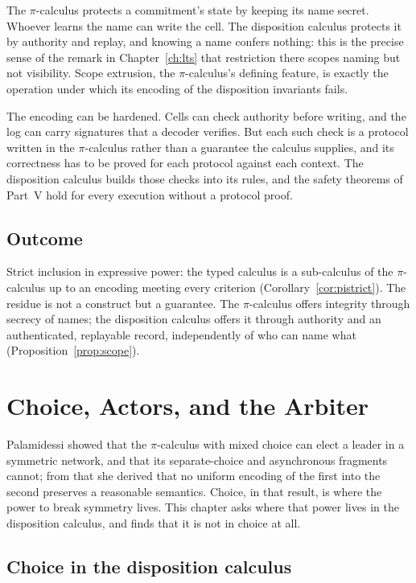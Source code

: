 \documentclass[11pt,openany]{book}
\theoremstyle{remark}
\begin{document}
The $\pi$-calculus protects a commitment's state by keeping its name
secret. Whoever learns the name can write the cell. The disposition
calculus protects it by authority and replay, and knowing a name confers
nothing: this is the precise sense of the remark in
Chapter~\ref{ch:lts} that restriction there scopes naming but not
visibility. Scope extrusion, the $\pi$-calculus's defining feature, is
exactly the operation under which its encoding of the disposition
invariants fails.

The encoding can be hardened. Cells can check authority before writing,
and the log can carry signatures that a decoder verifies. But each such
check is a protocol written in the $\pi$-calculus rather than a guarantee
the calculus supplies, and its correctness has to be proved for each
protocol against each context. The disposition calculus builds those
checks into its rules, and the safety theorems of Part~V hold for every
execution without a protocol proof.

\section{Outcome}

Strict inclusion in expressive power: the typed calculus is a
sub-calculus of the $\pi$-calculus up to an encoding meeting every
criterion (Corollary~\ref{cor:pistrict}). The residue is not a construct
but a guarantee. The $\pi$-calculus offers integrity through secrecy of
names; the disposition calculus offers it through authority and an
authenticated, replayable record, independently of who can name what
(Proposition~\ref{prop:scope}).

\chapter{Choice, Actors, and the Arbiter}
\label{ch:choice}

Palamidessi showed that the $\pi$-calculus with mixed choice can elect a
leader in a symmetric network, and that its separate-choice and
asynchronous fragments cannot; from that she derived that no uniform
encoding of the first into the second preserves a reasonable semantics.
Choice, in that result, is where the power to break symmetry lives. This
chapter asks where that power lives in the disposition calculus, and finds
that it is not in choice at all.

\section{Choice in the disposition calculus}
\end{document}
